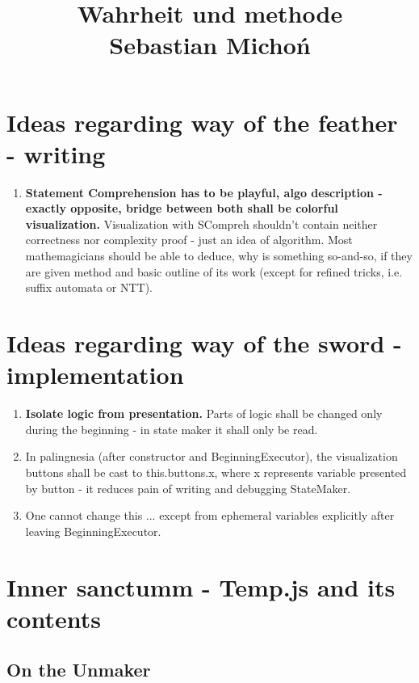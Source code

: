 \documentclass[12pt]{article}
\begin{document}
\title{Wahrheit und methode\\
\large Sebastian Michoń}
\date{\vspace{-10ex}}
\maketitle

\section {Ideas regarding way of the feather - writing}
\begin{enumerate}
	\item \textbf{Statement Comprehension has to be playful, algo description - exactly opposite, bridge between both shall be colorful visualization.} Visualization with SCompreh shouldn't contain neither correctness nor complexity proof - just an idea of algorithm. Most mathemagicians should be able to deduce, why is something so-and-so, if they are given method and basic outline of its work (except for refined tricks, i.e. suffix automata or NTT).
\end{enumerate}

\section {Ideas regarding way of the sword - implementation}
\begin{enumerate}
	\item \textbf{Isolate logic from presentation.} Parts of logic shall be changed only during the beginning - in state maker it shall only be read.
	\item In palingnesia (after constructor and BeginningExecutor), the visualization buttons shall be cast to this.buttons.x, where x represents variable presented by button - it reduces pain of writing and debugging StateMaker.
	\item One cannot change this ... except from ephemeral variables explicitly after leaving BeginningExecutor.
\end{enumerate}
\section {Inner sanctumm - Temp.js and its contents}


\subsection {On the Unmaker}
\end{document}
